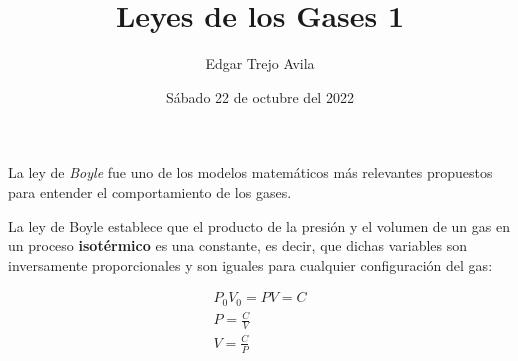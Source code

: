 \documentclass{article}
\title{Leyes de los Gases 1}
\author{Edgar Trejo Avila}
\date{Sábado 22 de octubre del 2022}
\begin{document}
\maketitle

La ley de \textit{Boyle} fue uno de los modelos
matemáticos más relevantes propuestos para entender
el comportamiento de los gases.

La ley de Boyle establece que el producto de la presión
y el volumen de un gas en un proceso \textbf{isotérmico}
es una constante, es decir, que dichas variables son 
inversamente proporcionales y son iguales para cualquier
configuración del gas:

\begin{align*}
    P_0V_0 = PV = C \\
    P = \frac{C}{V} \\
    V = \frac{C}{P}
\end{align*}
\end{document}
